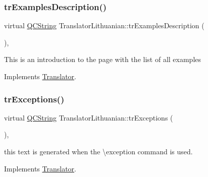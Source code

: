 \mbox{\label{class_translator_lithuanian_a90ac6bb0840add6c1f15cd38816c3567}} 
\subsubsection{\texorpdfstring{trExamplesDescription()}{trExamplesDescription()}}
{\footnotesize\ttfamily virtual \mbox{\hyperlink{class_q_c_string}{Q\+C\+String}} Translator\+Lithuanian\+::tr\+Examples\+Description (\begin{DoxyParamCaption}{ }\end{DoxyParamCaption})\hspace{0.3cm}{\ttfamily [inline]}, {\ttfamily [virtual]}}

This is an introduction to the page with the list of all examples 

Implements \mbox{\hyperlink{class_translator}{Translator}}.

\mbox{\label{class_translator_lithuanian_a50bada60cd2c5099d5dd0c4c37175298}} 
\subsubsection{\texorpdfstring{trExceptions()}{trExceptions()}}
{\footnotesize\ttfamily virtual \mbox{\hyperlink{class_q_c_string}{Q\+C\+String}} Translator\+Lithuanian\+::tr\+Exceptions (\begin{DoxyParamCaption}{ }\end{DoxyParamCaption})\hspace{0.3cm}{\ttfamily [inline]}, {\ttfamily [virtual]}}

this text is generated when the \textbackslash{}exception command is used. 

Implements \mbox{\hyperlink{class_translator}{Translator}}.

\mbox{\label{class_translator_lithuanian_a65dcc8de7cfdb21648b06d1aa16c18cc}} 
